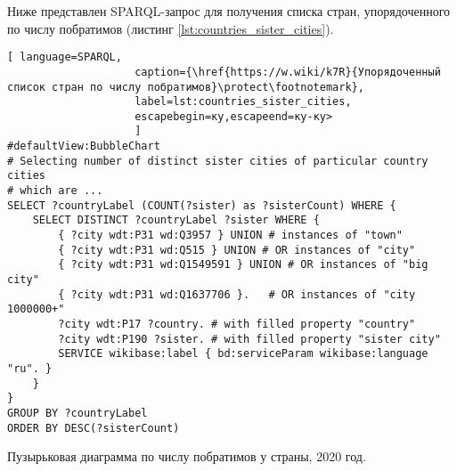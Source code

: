 
Ниже представлен SPARQL-запрос для получения списка стран, упорядоченного по числу побратимов (листинг \ref{lst:countries_sister_cities}).

\begin{lstlisting}[ language=SPARQL, 
                    caption={\href{https://w.wiki/k7R}{Упорядоченный список стран по числу побратимов}\protect\footnotemark},
                    label=lst:countries_sister_cities, 
                    escapebegin=ку,escapeend=ку-ку>
                    ]
#defaultView:BubbleChart
# Selecting number of distinct sister cities of particular country cities 
# which are ... 
SELECT ?countryLabel (COUNT(?sister) as ?sisterCount) WHERE { 
	SELECT DISTINCT ?countryLabel ?sister WHERE {
		{ ?city wdt:P31 wd:Q3957 } UNION # instances of "town"
		{ ?city wdt:P31 wd:Q515 } UNION # OR instances of "city"
		{ ?city wdt:P31 wd:Q1549591 } UNION # OR instances of "big city"
		{ ?city wdt:P31 wd:Q1637706 }.	 # OR instances of "city 1000000+"
		?city wdt:P17 ?country. # with filled property "country"
		?city wdt:P190 ?sister. # with filled property "sister city"
		SERVICE wikibase:label { bd:serviceParam wikibase:language "ru". }
	}                                 
}
GROUP BY ?countryLabel
ORDER BY DESC(?sisterCount)
\end{lstlisting}

\begin{marginfigure}[0.0cm]
{
\setlength{\fboxsep}{0pt}%
\setlength{\fboxrule}{1pt}%
%
}
  \caption{Пузырьковая диаграмма по числу побратимов у страны, 2020 год.}%
  \label{fig:Bubble_countries_sister_cities}%
\end{marginfigure}

